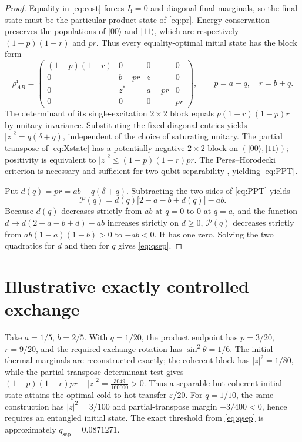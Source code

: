 \documentclass[11pt,a4paper]{article}
\newcommand{\eps}{\varepsilon}
\begin{document}
\begin{proof}
Equality in \eqref{eq:cost} forces $I_{\mathrm f}=0$ and diagonal final marginals, so the final state must be the particular product state of \eqref{eq:pr}. Energy conservation preserves the populations of $|00\rangle$ and $|11\rangle$, which are respectively $(1-p)(1-r)$ and $pr$. Thus every equality-optimal initial state has the block form
\begin{equation}\label{eq:Xstate}
\rho_{AB}^{\mathrm i}=
\begin{pmatrix}
(1-p)(1-r)&0&0&0\\
0&b-pr&z&0\\
0&z^*&a-pr&0\\
0&0&0&pr
\end{pmatrix},\qquad p=a-q,\quad r=b+q.
\end{equation}
The determinant of its single-excitation $2\times2$ block equals $p(1-r)(1-p)r$ by unitary invariance. Substituting the fixed diagonal entries yields $|z|^2=q(\delta+q)$, independent of the choice of saturating unitary. The partial transpose of \eqref{eq:Xstate} has a potentially negative $2\times2$ block on $(|00\rangle,|11\rangle)$; positivity is equivalent to $|z|^2\le(1-p)(1-r)pr$. The Peres--Horodecki criterion is necessary and sufficient for two-qubit separability \cite{peres,horodecki}, yielding \eqref{eq:PPT}.

Put $d(q)=pr=ab-q(\delta+q)$. Subtracting the two sides of \eqref{eq:PPT} yields
\[
\mathcal P(q)=d(q)\bigl[2-a-b+d(q)\bigr]-ab.
\]
Because $d(q)$ decreases strictly from $ab$ at $q=0$ to $0$ at $q=a$, and the function $d\mapsto d(2-a-b+d)-ab$ increases strictly on $d\ge0$, $\mathcal P(q)$ decreases strictly from $ab(1-a)(1-b)>0$ to $-ab<0$. It has one zero. Solving the two quadratics for $d$ and then for $q$ gives \eqref{eq:qsep}.
\end{proof}

\section{Illustrative exactly controlled exchange}
Take $a=1/5$, $b=2/5$. With $q=1/20$, the product endpoint has $p=3/20$, $r=9/20$, and the required exchange rotation has $\sin^2\theta=1/6$. The initial thermal marginals are reconstructed exactly; the coherent block has $|z|^2=1/80$, while the partial-transpose determinant test gives $(1-p)(1-r)pr-|z|^2=\tfrac{3049}{160000}>0$. Thus a separable but coherent initial state attains the optimal cold-to-hot transfer $\eps/20$. For $q=1/10$, the same construction has $|z|^2=3/100$ and partial-transpose margin $-3/400<0$, hence requires an entangled initial state. The exact threshold from \eqref{eq:qsep} is approximately $q_{\mathrm{sep}}=0.0871271$.
\end{document}
